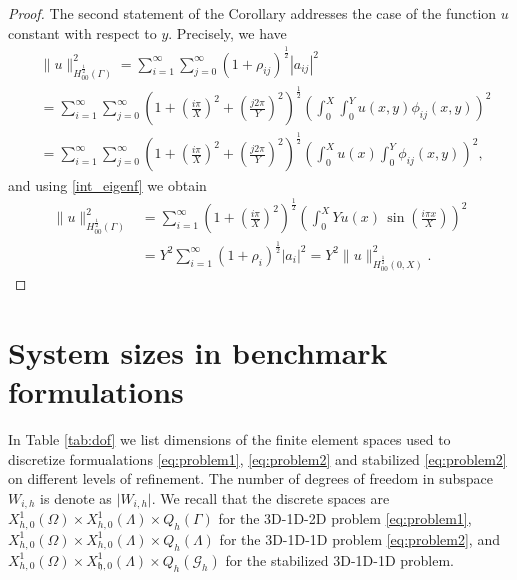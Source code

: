 \begin{proof}
The second statement of the Corollary addresses the case of the function $u$ constant with respect to $y$. Precisely, we have
\begin{equation*}
    \begin{aligned}
&\|u\|^2_{H^{\frac 12}_{00}(\Gamma)}=\sum_{i=1}^{\infty}\sum_{j=0}^{\infty} \left( 1+ \rho_{ij}\right)^{\frac 12}|a_{ij}|^2\\
&=\sum_{i=1}^{\infty}\sum_{j=0}^{\infty} \left(  1+ \left(\frac{i\pi}{X}\right)^2 + \left(\frac{j2\pi}{Y}\right)^2\right)^{\frac 12}\left( \int _0^X\int _0^Y u(x,y )\phi_{ij}(x,y) \right)^2
\\
&=\sum_{i=1}^{\infty}\sum_{j=0}^{\infty} \left(  1+ \left(\frac{i\pi}{X}\right)^2 + \left(\frac{j2\pi}{Y}\right)^2\right)^{\frac 12}\left( \int _0^X u(x) \int _0^Y \phi_{ij}(x,y) \right)^2,
\end{aligned}
\end{equation*}
and using \eqref{int_eigenf} we obtain
\begin{equation*}
\begin{aligned}
\|u\|^2_{H^{\frac 12}_{00}(\Gamma)}
&=\sum_{i=1}^{\infty}\left( 1+ \left(\frac{i\pi}{X}\right)^2\right)^{\frac 12}\left(\int _0^X Yu(x)\, \sin\left(\frac{i\pi x}{X}\right)\right)^2\\
&=Y^2 \sum_{i=1}^{\infty}\left( 1+ \rho _i\right)^{\frac 12}|a_i|^2 = Y^2  \|u\|^2_{H^{\frac 12}_{00}(0,X)}.
\end{aligned}
\end{equation*}
\end{proof}

\section{System sizes in benchmark formulations} \label{sec:appendix}
In Table \ref{tab:dof} we list dimensions of the finite element spaces used to discretize formualations \eqref{eq:problem1}, \eqref{eq:problem2} and stabilized
\eqref{eq:problem2} on different levels of refinement. The number of 
degrees of freedom in subspace $W_{i, h}$ is denote as $\lvert W_{i, h}\rvert$. 
We recall that the discrete spaces  
are $X^1_{h, 0}(\Omega)\times X^1_{h, 0}(\Lambda)\times Q_h(\Gamma)$
for the 3D-1D-2D problem \eqref{eq:problem1},
$X^1_{h, 0}(\Omega)\times X^1_{h, 0}(\Lambda)\times Q_h(\Lambda)$
for the 3D-1D-1D problem \eqref{eq:problem2}, and 
$X^1_{h, 0}(\Omega)\times X^1_{\mathfrak{h}, 0}(\Lambda)\times Q_h(\mathcal{G}_h)$
for the stabilized 3D-1D-1D problem.

